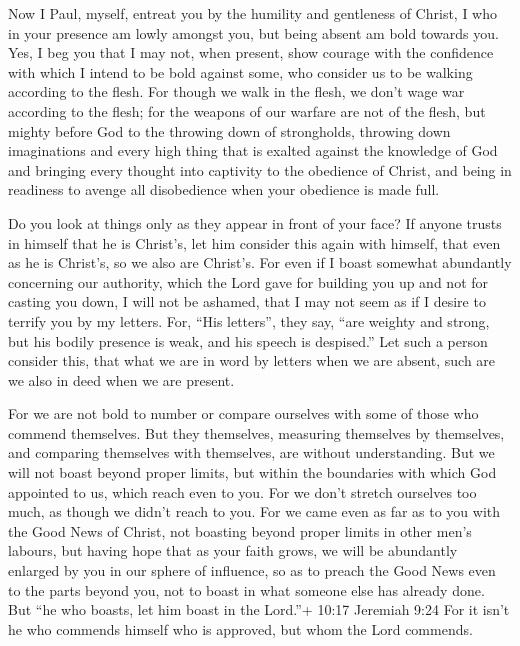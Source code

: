  Now I Paul, myself, entreat you by the humility and
gentleness of Christ, I who in your presence am lowly amongst you, but
being absent am bold towards you.  Yes, I beg you that I may
not, when present, show courage with the confidence with which I intend
to be bold against some, who consider us to be walking according to the
flesh.  For though we walk in the flesh, we don't wage war
according to the flesh;  for the weapons of our warfare are
not of the flesh, but mighty before God to the throwing down of
strongholds,  throwing down imaginations and every high
thing that is exalted against the knowledge of God and bringing every
thought into captivity to the obedience of Christ,  and
being in readiness to avenge all disobedience when your obedience is
made full.

 Do you look at things only as they appear in front of your
face? If anyone trusts in himself that he is Christ's, let him consider
this again with himself, that even as he is Christ's, so we also are
Christ's.  For even if I boast somewhat abundantly
concerning our authority, which the Lord gave for building you up and
not for casting you down, I will not be ashamed,  that I may
not seem as if I desire to terrify you by my letters.  For,
``His letters'', they say, ``are weighty and strong, but his bodily
presence is weak, and his speech is despised.''  Let such a
person consider this, that what we are in word by letters when we are
absent, such are we also in deed when we are present.

 For we are not bold to number or compare ourselves with
some of those who commend themselves. But they themselves, measuring
themselves by themselves, and comparing themselves with themselves, are
without understanding.  But we will not boast beyond proper
limits, but within the boundaries with which God appointed to us, which
reach even to you.  For we don't stretch ourselves too
much, as though we didn't reach to you. For we came even as far as to
you with the Good News of Christ,  not boasting beyond
proper limits in other men's labours, but having hope that as your faith
grows, we will be abundantly enlarged by you in our sphere of influence,
 so as to preach the Good News even to the parts beyond
you, not to boast in what someone else has already done. 
But ``he who boasts, let him boast in the Lord.''+ 10:17 Jeremiah 9:24
 For it isn't he who commends himself who is approved, but
whom the Lord commends.

